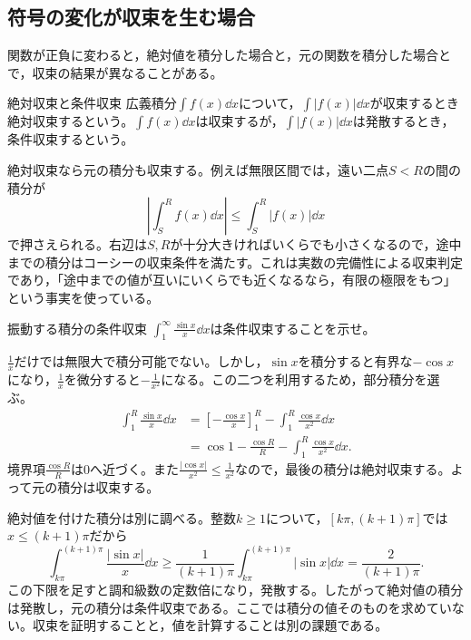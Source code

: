 \subsection{符号の変化が収束を生む場合}

関数が正負に変わると，絶対値を積分した場合と，元の関数を積分した場合とで，収束の結果が異なることがある。

\begin{definition}{絶対収束と条件収束}
広義積分$\int f(x)\dd x$について，$\int|f(x)|\dd x$が収束するとき絶対収束するという。$\int f(x)\dd x$は収束するが，$\int|f(x)|\dd x$は発散するとき，条件収束するという。
\end{definition}

絶対収束なら元の積分も収束する。例えば無限区間では，遠い二点$S<R$の間の積分が
\[
 \left|\int_S^Rf(x)\dd x\right|\leq\int_S^R|f(x)|\dd x
\]
で押さえられる。右辺は$S,R$が十分大きければいくらでも小さくなるので，途中までの積分はコーシーの収束条件を満たす。これは実数の完備性による収束判定であり，「途中までの値が互いにいくらでも近くなるなら，有限の極限をもつ」という事実を使っている。

\begin{example}{振動する積分の条件収束}
$\int_1^{\infty}\frac{\sin x}{x}\dd x$は条件収束することを示せ。
\end{example}

$\frac1x$だけでは無限大で積分可能でない。しかし，$\sin x$を積分すると有界な$-\cos x$になり，$\frac1x$を微分すると$-\frac1{x^2}$になる。この二つを利用するため，部分積分を選ぶ。
\[
\begin{aligned}
 \int_1^R\frac{\sin x}{x}\dd x
 &=\left[-\frac{\cos x}{x}\right]_1^R
   -\int_1^R\frac{\cos x}{x^2}\dd x\\
 &=\cos1-\frac{\cos R}{R}-\int_1^R\frac{\cos x}{x^2}\dd x.
\end{aligned}
\]
境界項$\frac{\cos R}{R}$は$0$へ近づく。また$\frac{|\cos x|}{x^2}\leq\frac1{x^2}$なので，最後の積分は絶対収束する。よって元の積分は収束する。

絶対値を付けた積分は別に調べる。整数$k\geq1$について，$[k\pi,(k+1)\pi]$では$x\leq(k+1)\pi$だから
\[
 \int_{k\pi}^{(k+1)\pi}\frac{|\sin x|}{x}\dd x
 \geq\frac1{(k+1)\pi}\int_{k\pi}^{(k+1)\pi}|\sin x|\dd x
 =\frac2{(k+1)\pi}.
\]
この下限を足すと調和級数の定数倍になり，発散する。したがって絶対値の積分は発散し，元の積分は条件収束である。ここでは積分の値そのものを求めていない。収束を証明することと，値を計算することは別の課題である。

